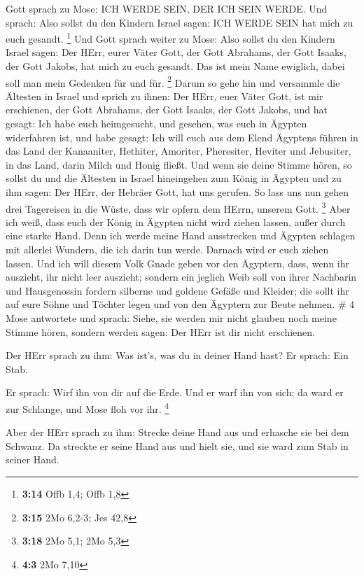  Gott sprach zu Mose: ICH WERDE SEIN, DER ICH SEIN WERDE.
Und sprach: Also sollst du den Kindern Israel sagen: ICH WERDE SEIN hat
mich zu euch gesandt. \footnote{\textbf{3:14} Offb 1,4; Offb 1,8}
 Und Gott sprach weiter zu Mose: Also sollst du den Kindern
Israel sagen: Der HErr, eurer Väter Gott, der Gott Abrahams, der Gott
Isaaks, der Gott Jakobs, hat mich zu euch gesandt. Das ist mein Name
ewiglich, dabei soll man mein Gedenken für und für. \footnote{\textbf{3:15}
  2Mo 6,2-3; Jes 42,8}  Darum so gehe hin und versammle die
Ältesten in Israel und sprich zu ihnen: Der HErr, euer Väter Gott, ist
mir erschienen, der Gott Abrahams, der Gott Isaaks, der Gott Jakobs, und
hat gesagt: Ich habe euch heimgesucht, und gesehen, was euch in Ägypten
widerfahren ist,  und habe gesagt: Ich will euch aus dem
Elend Ägyptens führen in das Land der Kanaaniter, Hethiter, Amoriter,
Pheresiter, Heviter und Jebusiter, in das Land, darin Milch und Honig
fließt.  Und wenn sie deine Stimme hören, so sollst du und
die Ältesten in Israel hineingehen zum König in Ägypten und zu ihm
sagen: Der HErr, der Hebräer Gott, hat uns gerufen. So lass uns nun
gehen drei Tagereisen in die Wüste, dass wir opfern dem HErrn, unserem
Gott. \footnote{\textbf{3:18} 2Mo 5,1; 2Mo 5,3}  Aber ich
weiß, dass euch der König in Ägypten nicht wird ziehen lassen, außer
durch eine starke Hand.  Denn ich werde meine Hand
ausstrecken und Ägypten schlagen mit allerlei Wundern, die ich darin tun
werde. Darnach wird er euch ziehen lassen.  Und ich will
diesem Volk Gnade geben vor den Ägyptern, dass, wenn ihr auszieht, ihr
nicht leer auszieht;  sondern ein jeglich Weib soll von
ihrer Nachbarin und Hausgenossin fordern silberne und goldene Gefäße und
Kleider; die sollt ihr auf eure Söhne und Töchter legen und von den
Ägyptern zur Beute nehmen. \# 4  Mose antwortete und sprach:
Siehe, sie werden mir nicht glauben noch meine Stimme hören, sondern
werden sagen: Der HErr ist dir nicht erschienen.

 Der HErr sprach zu ihm: Was ist's, was du in deiner Hand
hast? Er sprach: Ein Stab.

 Er sprach: Wirf ihn von dir auf die Erde. Und er warf ihn
von sich; da ward er zur Schlange, und Mose floh vor ihr. \footnote{\textbf{4:3}
  2Mo 7,10}

 Aber der HErr sprach zu ihm: Strecke deine Hand aus und
erhasche sie bei dem Schwanz. Da streckte er seine Hand aus und hielt
sie, und sie ward zum Stab in seiner Hand.

